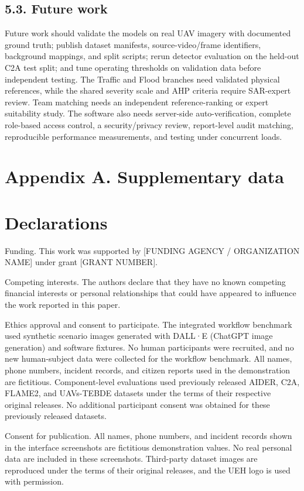 \documentclass[pdflatex,sn-mathphys-ay]{sn-jnl}
\begin{document}
\subsection*{5.3. Future work}

Future work should validate the models on real UAV imagery with documented ground truth; publish dataset manifests, source-video/frame identifiers, background mappings, and split scripts; rerun detector evaluation on the held-out C2A test split; and tune operating thresholds on validation data before independent testing. The Traffic and Flood branches need validated physical references, while the shared severity scale and AHP criteria require SAR-expert review. Team matching needs an independent reference-ranking or expert suitability study. The software also needs server-side auto-verification, complete role-based access control, a security/privacy review, report-level audit matching, reproducible performance measurements, and testing under concurrent loads.

\section*{Appendix A. Supplementary data}

\section*{Declarations}

Funding. This work was supported by [FUNDING AGENCY / ORGANIZATION NAME] under grant [GRANT NUMBER].

Competing interests. The authors declare that they have no known competing financial interests or personal relationships that could have appeared to influence the work reported in this paper.

Ethics approval and consent to participate. The integrated workflow benchmark used synthetic scenario images generated with DALL·E (ChatGPT image generation) and software fixtures. No human participants were recruited, and no new human-subject data were collected for the workflow benchmark. All names, phone numbers, incident records, and citizen reports used in the demonstration are fictitious. Component-level evaluations used previously released AIDER, C2A, FLAME2, and UAVs-TEBDE datasets under the terms of their respective original releases. No additional participant consent was obtained for these previously released datasets.

Consent for publication. All names, phone numbers, and incident records shown in the interface screenshots are fictitious demonstration values. No real personal data are included in these screenshots. Third-party dataset images are reproduced under the terms of their original releases, and the UEH logo is used with permission.
\end{document}
